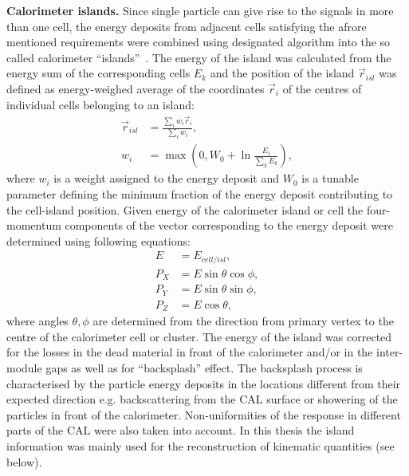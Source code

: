 \textbf{Calorimeter islands.}
Since single particle can give rise to the signals in more than one cell, the energy deposits from adjacent cells satisfying the afrore mentioned requirements were combined using designated algorithm into the so called calorimeter ``islands''~\cite{upub:grosse-knetter:zn9739}. The energy of the island was calculated from the energy sum of the corresponding cells $E_k$ and the position of the island $\vec{r}_{isl}$ was defined as energy-weighed average of the coordinates $\vec{r}_i$ of the centres of individual cells belonging to an island:
\begin{align}
\vec{r}_{isl} &= \frac{\sum_i{w_i \vec{r}_i}}{\sum_i{w_i}}, \\
w_i &= \max\left(0,W_0+\ln{\frac{E_i}{\sum_k{E_k}}}\right),
\end{align}
where $w_i$ is a weight assigned to the energy deposit and $W_0$ is a tunable parameter defining the minimum fraction of the energy deposit contributing to the cell-island position. Given energy of the calorimeter island or cell the four-momentum components of the vector corresponding to the energy deposit were determined using following equations:
\begin{align}
	E    &= E_{cell/isl}, \\
	P_X &= E \sin{\theta}\cos{\phi}, \\
	P_Y &= E \sin{\theta}\sin{\phi}, \\
	P_Z &= E \cos{\theta},
\end{align}
where angles $\theta, \phi$ are determined from the direction from primary vertex to the centre of the calorimeter cell or cluster. The energy of the island was corrected for the losses in the dead material in front of the calorimeter and/or in the inter-module gaps as well as for ``backsplash'' effect. The backsplash process is characterised by the particle energy deposits in the locations different from their expected direction e.g. backscattering from the CAL surface or showering of the particles in front of the calorimeter. Non-uniformities of the response in different parts of the CAL were also taken into account. In this thesis the island information was mainly used for the reconstruction of kinematic quantities (see below).